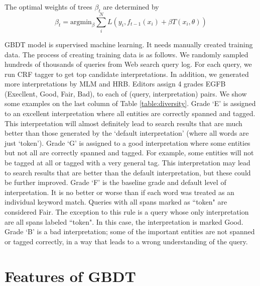 \documentclass[11pt]{article}
\begin{document}
\noindent The optimal weights of trees $\beta_t$ are determined by
$$
\beta_t = \text{argmin} _{\beta} \sum_i^N L(y_i, f_{t-1}(x_i) + \beta T(x_i, \theta))
$$


GBDT model is supervised machine learning. It needs manually created training data.
The process of creating training data is as follows. We randomly sampled hundreds of thousands of queries from Web search query log. For each query, we run CRF tagger to get top candidate interpretations. In addition, we generated more interpretations by MLM and HRB. Editors assign 4 grades EGFB (Execllent, Good, Fair, Bad), to each of (query, interpretation) pairs. We show some examples on the last column of Table \ref{table:diversity}. 
Grade `E' is assigned to an excellent interpretation where all entities are correctly spanned and tagged. This interpretation will almost definitely lead to search results that are much better than those generated by the `default interpretation' (where all words are just `token').
Grade `G' is assigned to a good interpretation where some entities but not all are correctly spanned and tagged. For example, some entities will not be tagged at all or tagged with a very general tag. This interpretation may lead to search results that are better than the default interpretation, but these could be further improved.
Grade `F' is the baseline grade and default level of interpretation. It is no better or worse than if each word was treated as an individual keyword match. Queries with all spans marked as ``token" are considered Fair. The exception to this rule is a query whose only interpretation are all spans labeled ``token". In this case, the interpretation is marked Good.
Grade `B' is a bad interpretation; some of the important entities are not spanned or tagged correctly, in a way that leads to a wrong understanding of the query.




\section{Features of GBDT}
\end{document}
